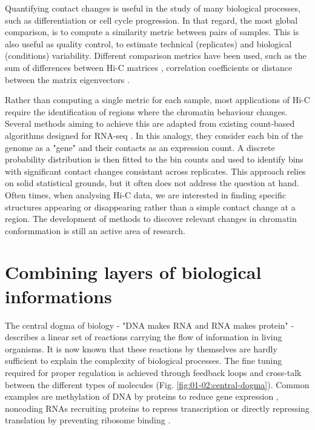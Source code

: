 Quantifying contact changes is useful in the study of many biological processes, such as differentiation or cell cycle progression. In that regard, the most global comparison, is to compute a similarity metric between pairs of samples. This is also useful as quality control, to estimate technical (replicates) and biological (conditions) variability. Different comparison metrics have been used, such as the sum of differences between Hi-C matrices \cite{ursuGenomeDISCOConcordanceScore2018}, correlation coefficients \cite{yangHiCRepAssessingReproducibility} or distance between the matrix eigenvectors \cite{yanHiCspectorMatrixLibrary2017}.

Rather than computing a single metric for each sample, most applications of Hi-C require the identification of regions where the chromatin behaviour changes. Several methods aiming to achieve this are adapted from existing count-based algorithms designed for RNA-seq \citep{lunDiffHicBioconductorPackage2015,stansfieldMultiHiCcompareJointNormalization2019,heinzSimpleCombinationsLineageDetermining2010}. In this analogy, they consider each bin of the genome as a "gene" and their contacts as an expression count. A discrete probability distribution is then fitted to the bin counts and used to identify bins with significant contact changes consistant across replicates. This approach relies on solid statistical grounds, but it often does not address the question at hand. Often times, when analysing Hi-C data, we are interested in finding specific structures appearing or disappearing rather than a simple contact change at a region. The development of methods to discover relevant changes in chromatin conformmation is still an active area of research.

\section{Combining layers of biological informations}

The central dogma of biology - "DNA makes RNA and RNA makes protein" - describes a linear set of reactions carrying the flow of information in living organisms. It is now known that these reactions by themselves are hardly sufficient to explain the complexity of biological processes. The fine tuning required for proper regulation is achieved through feedback loops and cross-talk between the different types of molecules (Fig. \ref{fig:01-02:central-dogma}). Common examples are methylation of DNA by proteins to reduce gene expression \cite{zemachGenomeWideEvolutionaryAnalysis2010}, noncoding RNAs recruiting proteins to repress transcription \cite{wangLongNoncodingRNA2018} or directly repressing translation by preventing ribosome binding \citep{sharmaSmallRNARegulates2007,vecerekControlFurSynthesis2007}.


